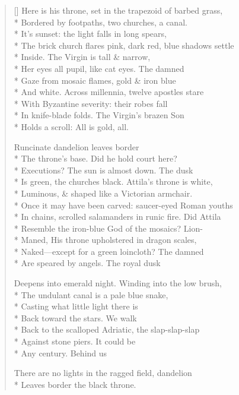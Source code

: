 \label{ch:venezia_torcello}
\settowidth{\versewidth}{In chains, scrolled salamanders in runic fire.   Did Attila}
\begin{verse}[\versewidth]
Here is his throne, set in the trapezoid of barbed grass,\\*
Bordered by footpaths, two churches, a canal.\\*
It's sunset: the light falls in long spears,\\*
The brick church flares pink, dark red, blue shadows settle\\*
Inside.    The Virgin is tall \& narrow,\\*
Her eyes all pupil, like cat eyes.     The damned\\*
Gaze from mosaic flames, gold \& iron blue\\*
And white.   Across millennia, twelve apostles stare\\*
With Byzantine severity: their robes fall\\*
In knife-blade folds. The Virgin's brazen Son\\*
Holds a scroll: All is gold, all.

Runcinate dandelion leaves border\\*
The throne's base.   Did he hold court here?\\*
Executions?   The sun is almost down.   The dusk\\*
Is green, the churches black.   Attila's throne is white,\\*
Luminous, \& shaped like a Victorian armchair.\\*
Once it may have been carved: saucer-eyed Roman youths\\*
In chains, scrolled salamanders in runic fire.   Did Attila\\*
Resemble the iron-blue God of the mosaics? Lion-\\*
Maned, His throne upholstered in dragon scales,\\*
Naked---except for a green loincloth?   The damned\\*
Are speared by angels.   The royal dusk

Deepens into emerald night.  Winding into the low brush,\\*
The undulant canal is a pale blue snake,\\*
Casting what little light there is\\*
Back toward the stars.     We walk\\*
Back to the scalloped Adriatic, the slap-slap-slap\\*
Against stone piers.    It could be\\*
Any century. Behind us

There are no lights in the ragged field, dandelion\\*
Leaves border the black throne.
\end{verse}

